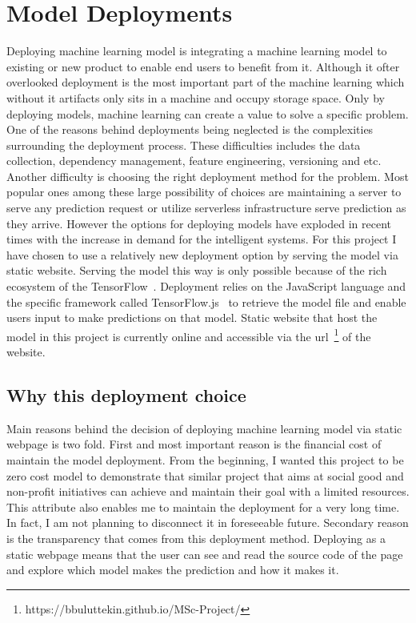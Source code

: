 \chapter{Model Deployments} \label{chap:deployment}
Deploying machine learning model is integrating a machine learning model to existing or new product to enable end users to benefit from it.
Although it ofter overlooked deployment is the most important part of the machine learning which without it artifacts only sits in a machine and occupy storage space.
Only by deploying models, machine learning can create a value to solve a specific problem.
One of the reasons behind deployments being neglected is the complexities surrounding the deployment process.
These difficulties includes the data collection, dependency management, feature engineering, versioning and etc.
Another difficulty is choosing the right deployment method for the problem.
Most popular ones among these large possibility of choices are maintaining a server to serve any prediction request or utilize serverless infrastructure serve prediction as they arrive.
However the options for deploying models have exploded in recent times with the increase in demand for the intelligent systems.
For this project I have chosen to use a relatively new deployment option by serving the model via static website.
Serving the model this way is only possible because of the rich ecosystem of the TensorFlow~\cite{tensorflow}.
Deployment relies on the JavaScript language and the specific framework called TensorFlow.js~\cite{tensorjs} to retrieve the model file and enable users input to make predictions on that model.
Static website that host the model in this project is currently online and accessible via the url~\footnote{https://bbuluttekin.github.io/MSc-Project/} of the website.

\section{Why this deployment choice} \label{sec:whythisdeploy}
Main reasons behind the decision of deploying machine learning model via static webpage is two fold.
First and most important reason is the financial cost of maintain the model deployment.
From the beginning, I wanted this project to be zero cost model to demonstrate that similar project that aims at social good and non-profit initiatives can achieve and maintain their goal with a limited resources.
This attribute also enables me to maintain the deployment for a very long time.
In fact, I am not planning to disconnect it in foreseeable future. 
Secondary reason is the transparency that comes from this deployment method.
Deploying as a static webpage means that the user can see and read the source code of the page and explore which model makes the prediction and how it makes it.

